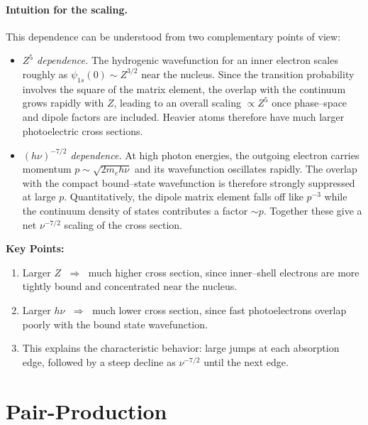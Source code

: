 \paragraph{Intuition for the scaling.}
This dependence can be understood from two complementary points of view:

\begin{itemize}
    \item \emph{$Z^5$ dependence.}  
    The hydrogenic wavefunction for an inner electron scales roughly as
    $\psi_{1s}(0) \sim Z^{3/2}$ near the nucleus. Since the transition
    probability involves the square of the matrix element, the overlap
    with the continuum grows rapidly with $Z$, leading to an overall
    scaling $\propto Z^5$ once phase--space and dipole factors are
    included. Heavier atoms therefore have much larger photoelectric
    cross sections.
    
    \item \emph{$(h\nu)^{-7/2}$ dependence.}  
    At high photon energies, the outgoing electron carries momentum
    $p \sim \sqrt{2 m_e h\nu}$ and its wavefunction oscillates rapidly.
    The overlap with the compact bound--state wavefunction is therefore
    strongly suppressed at large $p$. Quantitatively, the dipole matrix
    element falls off like $p^{-3}$ while the continuum density of
    states contributes a factor $\sim p$. Together these give a net
    $\nu^{-7/2}$ scaling of the cross section.
\end{itemize}

\begin{remark}
    \textbf{Key Points:}
    \begin{enumerate}
        \item Larger $Z$ $\;\Rightarrow\;$ much higher cross section,
              since inner--shell electrons are more tightly bound and
              concentrated near the nucleus.
        \item Larger $h\nu$ $\;\Rightarrow\;$ much lower cross section,
              since fast photoelectrons overlap poorly with the bound
              state wavefunction.
        \item This explains the characteristic behavior: large jumps at
              each absorption edge, followed by a steep decline as
              $\nu^{-7/2}$ until the next edge.
    \end{enumerate}
\end{remark}

\section{Pair-Production}

